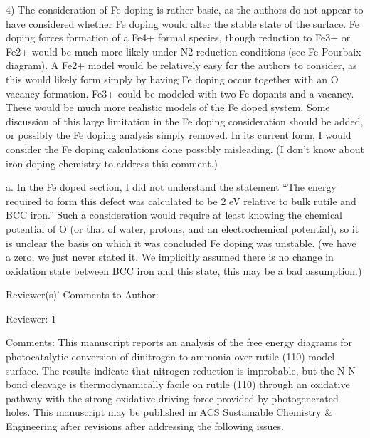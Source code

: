 4)      The consideration of Fe doping is rather basic, as the authors do not appear to have considered whether Fe doping would alter the stable state of the surface.  Fe doping forces formation of a Fe4+ formal species, though reduction to Fe3+ or Fe2+ would be much more likely under N2 reduction conditions (see Fe Pourbaix diagram).  A Fe2+ model would be relatively easy for the authors to consider, as this would likely form simply by having Fe doping occur together with an O vacancy formation.   Fe3+ could be modeled with two Fe dopants and a vacancy.  These would be much more realistic models of the Fe doped system.  Some discussion of this large limitation in the Fe doping consideration should be added, or possibly the Fe doping analysis simply removed.  In its current form, I would consider the Fe doping calculations done possibly misleading. (I don't know about iron doping chemistry to address this comment.)

a.      In the Fe doped section, I did not understand the statement “The energy required to form this defect was calculated to be 2 eV relative to bulk rutile and BCC iron.”  Such a consideration would require at least knowing the chemical potential of O (or that of water, protons, and an electrochemical potential), so it is unclear the basis on which it was concluded Fe doping was unstable. (we have a zero, we just never stated it. We implicitly assumed there is no change in oxidation state between BCC iron and this state, this may be a bad assumption.)


























Reviewer(s)' Comments to Author:

Reviewer: 1

Comments:
This manuscript reports an analysis of the free energy diagrams for photocatalytic conversion of dinitrogen to ammonia over rutile (110) model surface. The results indicate that nitrogen reduction is improbable, but the N-N bond cleavage is thermodynamically facile on rutile (110) through an oxidative pathway with the strong oxidative driving force provided by photogenerated holes. This manuscript may be published in ACS Sustainable Chemistry & Engineering after revisions after addressing the following issues.

